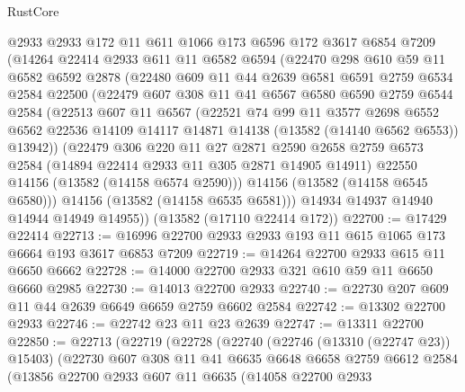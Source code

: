 \begin{lexlean}{RustCore}
\begin{coremodule}
    @2933
    @2933
    @172
    @11
    @611
    @1066
    @173
    @6596
    @172
    @3617
    @6854
    @7209
    (@14264
      @22414
      @2933
      @611
      @11
      @6582
      @6594
      (@22470
        @298
        @610
        @59
        @11
        @6582
        @6592
        @2878
        (@22480
          @609
          @11
          @44
          @2639
          @6581
          @6591
          @2759
          @6534
          @2584
          @22500
          (@22479
            @607
            @308
            @11
            @41
            @6567
            @6580
            @6590
            @2759
            @6544
            @2584
            (@22513
              @607
              @11
              @6567
              (@22521
                @74
                @99
                @11
                @3577
                @2698
                @6552
                @6562
                @22536
                @14109
                @14117
                @14871
                @14138
                (@13582 (@14140 @6562 @6553))
                @13942))
            (@22479
              @306
              @220
              @11
              @27
              @2871
              @2590
              @2658
              @2759
              @6573
              @2584
              (@14894 @22414 @2933 @11 @305 @2871 @14905 @14911)
              @22550
              @14156
              (@13582 (@14158 @6574 @2590)))
            @14156
            (@13582 (@14158 @6545 @6580)))
          @14156
          (@13582 (@14158 @6535 @6581)))
        @14934
        @14937
        @14940
        @14944
        @14949
        @14955))
    (@13582 (@17110 @22414 @172))
@22700 := @17429 @22414
@22713 := @16996 @22700 @2933 @2933 @193 @11 @615 @1065 @173 @6664 @193 @3617 @6853 @7209
@22719 := @14264 @22700 @2933 @615 @11 @6650 @6662
@22728 := @14000 @22700 @2933 @321 @610 @59 @11 @6650 @6660 @2985
@22730 := @14013 @22700 @2933
@22740 := @22730 @207 @609 @11 @44 @2639 @6649 @6659 @2759 @6602 @2584
@22742 := @13302 @22700 @2933
@22746 := @22742 @23 @11 @23 @2639
@22747 := @13311 @22700
@22850 := @22713
    (@22719
      (@22728
        (@22740
          (@22746 (@13310 (@22747 @23)) @15403)
          (@22730
            @607
            @308
            @11
            @41
            @6635
            @6648
            @6658
            @2759
            @6612
            @2584
            (@13856
              @22700
              @2933
              @607
              @11
              @6635
              (@14058
                @22700
                @2933

\end{coremodule}
\end{lexlean}
